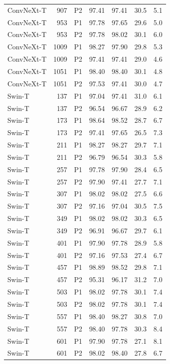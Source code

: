{\begin{longtable}{lrlrrrr}
ConvNeXt-T & 907 & P2 & 97.41 & 97.41 & 30.5 & 5.1 \\
ConvNeXt-T & 953 & P1 & 97.78 & 97.65 & 29.6 & 5.0 \\
ConvNeXt-T & 953 & P2 & 97.78 & 98.02 & 30.1 & 6.0 \\
ConvNeXt-T & 1009 & P1 & 98.27 & 97.90 & 29.8 & 5.3 \\
ConvNeXt-T & 1009 & P2 & 97.41 & 97.41 & 29.0 & 4.6 \\
ConvNeXt-T & 1051 & P1 & 98.40 & 98.40 & 30.1 & 4.8 \\
ConvNeXt-T & 1051 & P2 & 97.53 & 97.41 & 30.0 & 4.7 \\
Swin-T & 137 & P1 & 97.04 & 97.41 & 31.0 & 6.1 \\
Swin-T & 137 & P2 & 96.54 & 96.67 & 28.9 & 6.2 \\
Swin-T & 173 & P1 & 98.64 & 98.52 & 28.7 & 6.7 \\
Swin-T & 173 & P2 & 97.41 & 97.65 & 26.5 & 7.3 \\
Swin-T & 211 & P1 & 98.27 & 98.27 & 29.7 & 7.1 \\
Swin-T & 211 & P2 & 96.79 & 96.54 & 30.3 & 5.8 \\
Swin-T & 257 & P1 & 97.78 & 97.90 & 28.4 & 6.5 \\
Swin-T & 257 & P2 & 97.90 & 97.41 & 27.7 & 7.1 \\
Swin-T & 307 & P1 & 98.02 & 98.02 & 27.5 & 6.6 \\
Swin-T & 307 & P2 & 97.16 & 97.04 & 30.5 & 7.5 \\
Swin-T & 349 & P1 & 98.02 & 98.02 & 30.3 & 6.5 \\
Swin-T & 349 & P2 & 96.91 & 96.67 & 29.7 & 6.1 \\
Swin-T & 401 & P1 & 97.90 & 97.78 & 28.9 & 5.8 \\
Swin-T & 401 & P2 & 97.16 & 97.53 & 27.4 & 6.7 \\
Swin-T & 457 & P1 & 98.89 & 98.52 & 29.8 & 7.1 \\
Swin-T & 457 & P2 & 95.31 & 96.17 & 31.2 & 7.0 \\
Swin-T & 503 & P1 & 98.02 & 97.78 & 30.1 & 7.4 \\
Swin-T & 503 & P2 & 98.02 & 97.78 & 30.1 & 7.4 \\
Swin-T & 557 & P1 & 98.40 & 98.27 & 30.8 & 7.0 \\
Swin-T & 557 & P2 & 98.40 & 97.78 & 30.3 & 8.4 \\
Swin-T & 601 & P1 & 97.90 & 97.78 & 27.1 & 8.1 \\
Swin-T & 601 & P2 & 98.02 & 98.40 & 27.8 & 6.7 \\

\end{longtable}}
